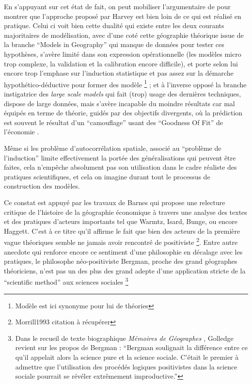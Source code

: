 En s'appuyant sur cet état de fait, on peut mobiliser l'argumentaire de \textcite{Wilson1972} pour montrer que l'approche proposé par Harvey est bien loin de ce qui est réalisé en pratique. Celui ci voit bien cette dualité qui existe entre les deux courants majoritaires de modélisation, avec d'une coté cette géographie théorique issue de la branche \foreignquote{english}{Models in Geography} qui manque de données pour tester ces hypothèses, s'avère limité dans son expression opérationnelle (les modèles micro trop complexe, la validation et la calibration encore difficile), et porte selon lui encore trop l'emphase sur l'induction statistique et pas assez sur la démarche hypothético-déductive pour former des modèle \footnote{Modèle est ici synonyme pour lui de théories} ; et à l'inverse opposé la branche instigatrice des \textit{large scale models} qui fait (trop) usage des dernières techniques, dispose de large données, mais s'avère incapable du moindre résultats car mal équipés en terme de théorie, guidés par des objectifs divergents, où la prédiction est souvent le résultat d'un \enquote{camouflage} usant des \foreignquote{english}{Goodness Of Fit} de l'économie \autocite[10]{Batty1994}.

Même si les problème d'autocorrélation spatiale, associé au \enquote{problème de l'induction} limite effectivement la portée des généralisations qui peuvent être faites, cela n’empêche absolument pas son utilisation dans le cadre réaliste des pratiques scientifiques, et cela on imagine durant tout le processus de construction des modèles.


Ce constat est appuyé par les travaux de Barnes qui propose une relecture critique de l'histoire de la géographie économique \autocite[122]{Barnes1996} à travers une analyse des textes et des pratiques d'acteurs importants tel que Warmtz, Isard, Bunge, ou encore Haggett. C'est à ce titre qu'il affirme \autocite{Barnes2001a} le fait que bien des acteurs de la première vague théoriques semble ne jamais avoir rencontré de positiviste \footnote{Morrill1993 citation à récupérer}. Entre autre anecdote qui renforce encore ce sentiment d'une philosophie en décalage avec les pratiques, le philosophe néo-positiviste Bergman, proche des grand géographes théoriciens, n'est pas un des plus des grand adepte d'une application stricte de la \foreignquote{english}{scientific method} aux sciences sociales \footnote{Dans le recueil de texte biographique \textit{Mémoires de Géographes} \textcite[96]{Bailly2000}, Golledge revient sur les propos de Bergman : \enquote{Bergman soulignait la différence entre ce qu'il appelait alors la science pure et la science sociale. C'était le premier à admettre que l'utilisation des procédés logiques positivistes dans la science sociale pourrait se révéler extrêmement improductive.} } 


